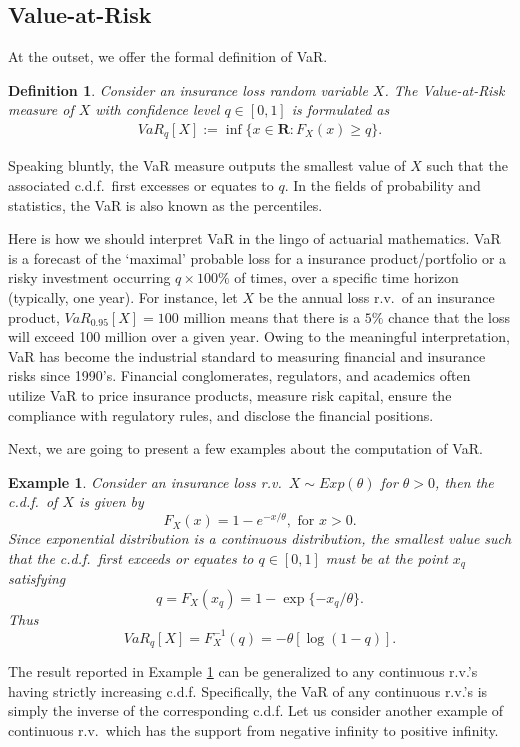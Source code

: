 \documentclass[12pt]{article}
\newtheorem{definition}{\bf Definition}
\newtheorem{example}{\bf Example}
\begin{document}
\subsection{Value-at-Risk}

At the outset, we offer the formal definition of VaR.
\begin{definition}
Consider an insurance loss random variable $X$.  The Value-at-Risk measure of $X$ with confidence level $q\in [0,1]$ is formulated as
\begin{eqnarray}
VaR_q[X]:=\inf\{x\in \mathbf{R}:F_X(x)\geq q\}.
\end{eqnarray}
\end{definition}
\noindent
Speaking bluntly, the VaR measure outputs the smallest value of $X$ such that the associated c.d.f.\ first excesses or equates to $q$.  In the fields of probability and statistics, the VaR is also known as the percentiles.

Here is how we should interpret VaR in the lingo of actuarial mathematics.  VaR is a forecast of the `maximal' probable loss for a insurance product/portfolio or a risky investment occurring $q\times 100\%$ of times, over a specific time horizon (typically, one year).  For instance, let $X$ be the annual loss r.v.\ of an insurance product, $VaR_{0.95}[X]=100$ million means that there is a $5\%$ chance that the loss will exceed 100 million over a given year.  Owing to the meaningful interpretation, VaR has become the industrial standard to measuring financial and insurance risks since 1990's.  Financial conglomerates, regulators, and academics often utilize VaR to price insurance products, measure risk capital, ensure the compliance with regulatory rules, and disclose the financial positions.

Next, we are going to present a few examples about the computation of VaR.
\begin{example}
\label{exm:exponential}
Consider an insurance loss r.v.\ $X\sim Exp(\theta)$ for $\theta>0$, then the c.d.f.\ of $X$ is given by \[
F_X(x)=1-e^{-x/\theta}, \text{ for } x>0.\]
Since exponential distribution is a continuous distribution, the smallest value such that the c.d.f.\ first exceeds or equates to $q \in [0,1]$ must be at the point $x_q$ satisfying
\[
q=F_X(x_q)=1-\exp\{-x_q/\theta \}.
\]
Thus
\[
VaR_q[X]=F_X^{-1}(q)=-\theta[\log(1-q)].
\]
\end{example}
The result reported in Example \ref{exm:exponential} can be generalized to any continuous r.v.'s having strictly increasing c.d.f.  Specifically, the VaR of any continuous r.v.'s is simply the inverse of the corresponding c.d.f.  Let us consider another example of continuous r.v.\ which has the support from negative infinity to positive infinity.
\end{document}
